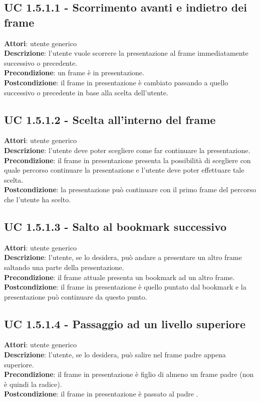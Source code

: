 	\subsection{UC 1.5.1.1 - Scorrimento avanti e indietro dei frame}{
		\label{uc1.5.1.1}
		\textbf{Attori}: utente generico \\
		\textbf{Descrizione}: l'utente vuole scorrere la presentazione al frame immediatamente successivo o precedente. \\
		\textbf{Precondizione}: un frame è in presentazione.	\\
		\textbf{Postcondizione}: il frame in presentazione è cambiato passando a quello successivo o precedente in base alla scelta dell'utente.	\\
	}
	\subsection{UC 1.5.1.2 - Scelta all'interno del frame}{
		\label{uc1.5.1.2}
		\textbf{Attori}: utente generico \\
		\textbf{Descrizione}: l'utente deve poter scegliere come far continuare la presentazione. \\
		\textbf{Precondizione}: il frame in presentazione presenta la possibilità di scegliere con quale percorso continuare la presentazione e l'utente deve poter effettuare tale scelta.	\\
		\textbf{Postcondizione}: la presentazione può continuare con il primo frame del percorso che l'utente ha scelto.	\\
	}
	\subsection{UC 1.5.1.3 - Salto al bookmark successivo}{
		\label{uc1.5.1.3}
		\textbf{Attori}: utente generico \\
		\textbf{Descrizione}: l'utente, se lo desidera, può andare a presentare un altro frame saltando una parte della presentazione. \\
		\textbf{Precondizione}: il frame attuale presenta un bookmark ad un altro frame.	\\
		\textbf{Postcondizione}: il frame in presentazione è quello puntato dal bookmark e la presentazione può continuare da questo punto.	\\
	}
	\subsection{UC 1.5.1.4 - Passaggio ad un livello superiore}{
		\label{uc1.5.1.4}
		\textbf{Attori}: utente generico \\
		\textbf{Descrizione}: l'utente, se lo desidera, può salire nel frame padre appena superiore. \\
		\textbf{Precondizione}: il frame in presentazione è figlio di almeno un frame padre (non è quindi la radice).	\\
		\textbf{Postcondizione}: il frame in presentazione è passato al padre .	\\
	}
